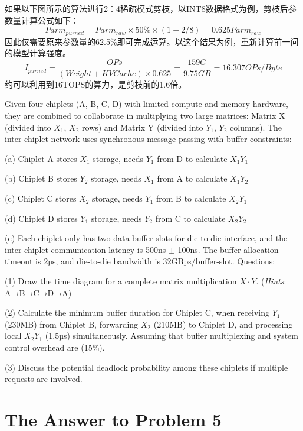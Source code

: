 \documentclass[11pt, a4 paper]{article}
\begin{document}
如果以下图所示的算法进行2：4稀疏模式剪枝，以INT8数据格式为例，剪枝后参数量计算公式如下：
$$Parm_{purned} = Parm_{raw} \times 50\% \times (1 + 2/8) = 0.625Parm_{raw}$$
因此仅需要原来参数量的62.5\%即可完成运算。以这个结果为例，重新计算前一问的模型计算强度。
$$ I_{purned} = \frac{OPs}{(Weight + KV Cache) \times 0.625} = \frac{159G}{9.75GB} = 16.307OPs/Byte$$
约可以利用到16TOPS的算力，是剪枝前的1.6倍。
\newpage

Given four chiplets (A, B, C, D) with limited compute and memory hardware, 
they are combined to collaborate in multiplying two large matrices:
Matrix X (divided into $X_1$, $X_2$ rows) and Matrix Y (divided into $Y_1$, $Y_2$ columns). The inter-chiplet network uses synchronous message passing with buffer constraints:

(a) Chiplet A stores $X_1$ storage, needs $Y_1$ from D to calculate $X_1Y_1$

(b) Chiplet B stores $Y_2$ storage, needs $X_1$ from A to calculate $X_1Y_2$

(c) Chiplet C stores $X_2$ storage, needs $Y_1$ from B to calculate $X_2Y_1$

(d) Chiplet D stores $Y_1$ storage, needs $Y_2$ from C to calculate $X_2Y_2$

(e) Each chiplet only has two data buffer slots for die-to-die interface, and the inter-chiplet communication latency is 500ns $\pm$ 100ns. The buffer allocation timeout is 2µs, and die-to-die bandwidth is 32GBps/buffer-slot.
Questions:

(1) Draw the time diagram for a complete matrix multiplication $X\cdot Y$. (\emph{Hints}: A→B→C→D→A)

(2) Calculate the minimum buffer duration for Chiplet C, when receiving $Y_1$ (230MB) from Chiplet B, forwarding $X_2$ (210MB) to Chiplet D, and processing local  $X_2Y_1$ (1.5µs) simultaneously. Assuming that buffer multiplexing and system control overhead are (15\%).

(3) Discuss the potential deadlock probability among these chiplets if multiple requests are involved. 

\section{The Answer to Problem 5}
\end{document}
